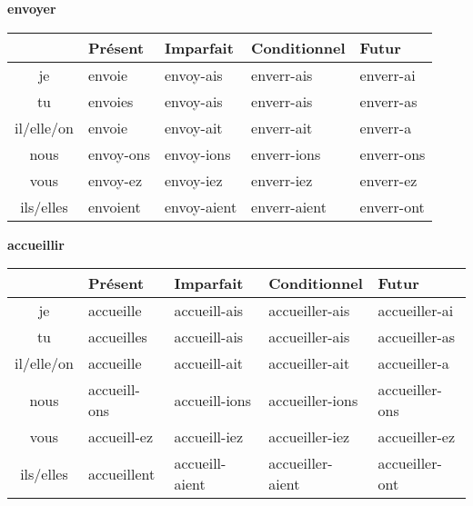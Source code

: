 \renewcommand{\stemPresent}{envoy}
\renewcommand{\stemFutur}{enverr}
\begin{center}
\textbf{envoyer}
\vskip 0.1cm
\begin{tabular}{|c||L{3cm}|L{3cm}|L{3cm}|L{3cm}|}
\hline
& Pr\'esent & Imparfait & Conditionnel & Futur \\
\hline\hline
je           &	envoie 	&	\stemPresent-ais	&	\stemFutur-ais	 &	\stemFutur-ai	\\
tu           &	envoies		&	\stemPresent-ais	&	\stemFutur-ais	&	\stemFutur-as	\\
il/elle/on &	envoie		&	\stemPresent-ait	&	\stemFutur-ait	&	\stemFutur-a	\\
nous      &	\stemPresent-ons	&	\stemPresent-ions	&	\stemFutur-ions	&	\stemFutur-ons	\\
vous      &	\stemPresent-ez	&	\stemPresent-iez	&	\stemFutur-iez		&	\stemFutur-ez	\\
ils/elles  &	envoient		&	\stemPresent-aient	&	\stemFutur-aient	&	\stemFutur-ont	\\
\hline
\end{tabular}
\end{center}

\renewcommand{\stemPresent}{accueill}
\renewcommand{\stemFutur}{accueiller}
\begin{center}
\textbf{accueillir}
\vskip 0.1cm
\begin{tabular}{|c||L{3cm}|L{3cm}|L{3cm}|L{3cm}|}
\hline
& Pr\'esent & Imparfait & Conditionnel & Futur \\
\hline\hline
je           &	accueille 	&	\stemPresent-ais	&	\stemFutur-ais	 &	\stemFutur-ai	\\
tu           &	accueilles		&	\stemPresent-ais	&	\stemFutur-ais	&	\stemFutur-as	\\
il/elle/on &	accueille		&	\stemPresent-ait	&	\stemFutur-ait	&	\stemFutur-a	\\
nous      &	\stemPresent-ons	&	\stemPresent-ions	&	\stemFutur-ions	&	\stemFutur-ons	\\
vous      &	\stemPresent-ez	&	\stemPresent-iez	&	\stemFutur-iez		&	\stemFutur-ez	\\
ils/elles  &	accueillent		&	\stemPresent-aient	&	\stemFutur-aient	&	\stemFutur-ont	\\
\hline
\end{tabular}
\end{center}


\clearpage

